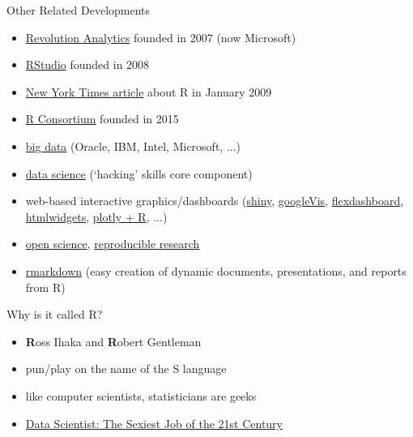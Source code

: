 \documentclass[t,12pt]{beamer}
\begin{document}
\begin{frame}{Other Related Developments}

\begin{itemize}
   \item \href{https://en.wikipedia.org/wiki/Revolution_Analytics}{Revolution Analytics} founded in 2007 (now Microsoft)
   \item \href{http://www.rstudio.com/}{RStudio} founded in 2008
   \item \href{http://www.nytimes.com/2009/01/07/technology/business-computing/07program.html}{New York Times article} about R in January 2009
   \item \href{https://www.r-consortium.org/}{R Consortium} founded in 2015
   \item \href{http://en.wikipedia.org/wiki/Big_data}{big data} (Oracle, IBM, Intel, Microsoft, ...)
   \item \href{http://en.wikipedia.org/wiki/Data_science}{data science} (`hacking' skills core component)
   \item web-based interactive graphics/dashboards (\href{http://shiny.rstudio.com/}{shiny}, \href{http://cran.r-project.org/web/packages/googleVis/index.html}{googleVis}, \href{http://rmarkdown.rstudio.com/flexdashboard/}{flexdashboard}, \href{http://www.htmlwidgets.org/}{htmlwidgets}, \href{https://plot.ly/r/}{plotly + R}, ...)
   \item \href{http://en.wikipedia.org/wiki/Open_science}{open science}, \href{http://en.wikipedia.org/wiki/Reproducibility}{reproducible research}
   \item \href{http://rmarkdown.rstudio.com/}{rmarkdown} (easy creation of dynamic documents, presentations, and reports from R)
\end{itemize}


\end{frame}


\begin{frame}{Why is it called R?}

\begin{itemize}
   \item \textbf{R}oss Ihaka and \textbf{R}obert Gentleman
   \item pun/play on the name of the S language
   \item like computer scientists, statisticians are geeks
   \item<2-> \href{https://hbr.org/2012/10/data-scientist-the-sexiest-job-of-the-21st-century/}{Data Scientist: The Sexiest Job of the 21st Century}
\end{itemize}

\end{frame}
\end{document}
